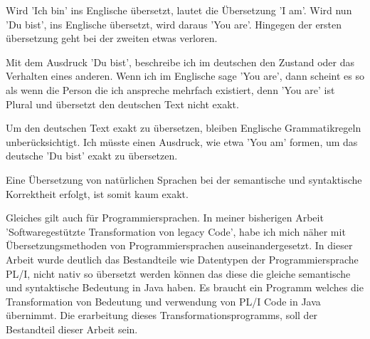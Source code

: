 Wird 'Ich bin' ins Englische übersetzt, lautet die Übersetzung 'I am'. Wird nun 'Du bist', ins Englische übersetzt, wird daraus 'You are'. Hingegen der ersten übersetzung geht bei der zweiten etwas verloren. 

Mit dem Ausdruck 'Du bist', beschreibe ich im deutschen den Zustand oder das Verhalten eines anderen. Wenn ich im Englische sage 'You are', dann scheint es so als wenn die Person die ich anspreche mehrfach existiert, denn 'You are' ist Plural und übersetzt den deutschen Text nicht exakt. 

Um den deutschen Text exakt zu übersetzen, bleiben Englische Grammatikregeln unberücksichtigt. Ich müsste einen Ausdruck, wie etwa 'You am' formen, um das deutsche 'Du bist' exakt zu übersetzen. 

Eine Übersetzung von natürlichen Sprachen bei der semantische und syntaktische Korrektheit erfolgt, ist somit kaum exakt.

Gleiches gilt auch für Programmiersprachen. In meiner bisherigen Arbeit 'Softwaregestützte Transformation von legacy Code', habe ich mich näher mit Übersetzungsmethoden von Programmiersprachen auseinandergesetzt. In dieser Arbeit wurde deutlich das Bestandteile wie Datentypen der Programmiersprache PL/I, nicht nativ so übersetzt werden können das diese die gleiche semantische und syntaktische Bedeutung in Java haben. Es braucht ein Programm welches die Transformation von Bedeutung und verwendung von PL/I Code in Java übernimmt. Die erarbeitung dieses Transformationsprogramms, soll der Bestandteil dieser Arbeit sein.